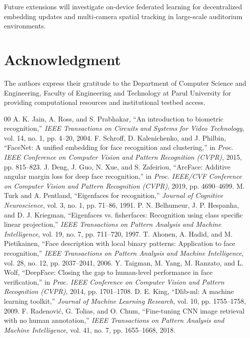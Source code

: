 \documentclass[conference]{IEEEtran}
\begin{document}
Future extensions will investigate on-device federated learning for decentralized embedding updates and multi-camera spatial tracking in large-scale auditorium environments.

\section*{Acknowledgment}
The authors express their gratitude to the Department of Computer Science and Engineering, Faculty of Engineering and Technology at Parul University for providing computational resources and institutional testbed access.

\balance
\begin{thebibliography}{00}
 A. K. Jain, A. Ross, and S. Prabhakar, ``An introduction to biometric recognition,'' \textit{IEEE Transactions on Circuits and Systems for Video Technology}, vol. 14, no. 1, pp. 4--20, 2004.
 F. Schroff, D. Kalenichenko, and J. Philbin, ``FaceNet: A unified embedding for face recognition and clustering,'' in \textit{Proc. IEEE Conference on Computer Vision and Pattern Recognition (CVPR)}, 2015, pp. 815--823.
 J. Deng, J. Guo, N. Xue, and S. Zafeiriou, ``ArcFace: Additive angular margin loss for deep face recognition,'' in \textit{Proc. IEEE/CVF Conference on Computer Vision and Pattern Recognition (CVPR)}, 2019, pp. 4690--4699.
 M. Turk and A. Pentland, ``Eigenfaces for recognition,'' \textit{Journal of Cognitive Neuroscience}, vol. 3, no. 1, pp. 71--86, 1991.
 P. N. Belhumeur, J. P. Hespanha, and D. J. Kriegman, ``Eigenfaces vs. fisherfaces: Recognition using class specific linear projection,'' \textit{IEEE Transactions on Pattern Analysis and Machine Intelligence}, vol. 19, no. 7, pp. 711--720, 1997.
 T. Ahonen, A. Hadid, and M. Pietikainen, ``Face description with local binary patterns: Application to face recognition,'' \textit{IEEE Transactions on Pattern Analysis and Machine Intelligence}, vol. 28, no. 12, pp. 2037--2041, 2006.
 Y. Taigman, M. Yang, M. Ranzato, and L. Wolf, ``DeepFace: Closing the gap to human-level performance in face verification,'' in \textit{Proc. IEEE Conference on Computer Vision and Pattern Recognition (CVPR)}, 2014, pp. 1701--1708.
 D. E. King, ``Dlib-ml: A machine learning toolkit,'' \textit{Journal of Machine Learning Research}, vol. 10, pp. 1755--1758, 2009.
 F. Radenovi{\'c}, G. Tolias, and O. Chum, ``Fine-tuning CNN image retrieval with no human annotation,'' \textit{IEEE Transactions on Pattern Analysis and Machine Intelligence}, vol. 41, no. 7, pp. 1655--1668, 2018.

\end{thebibliography}
\end{document}
